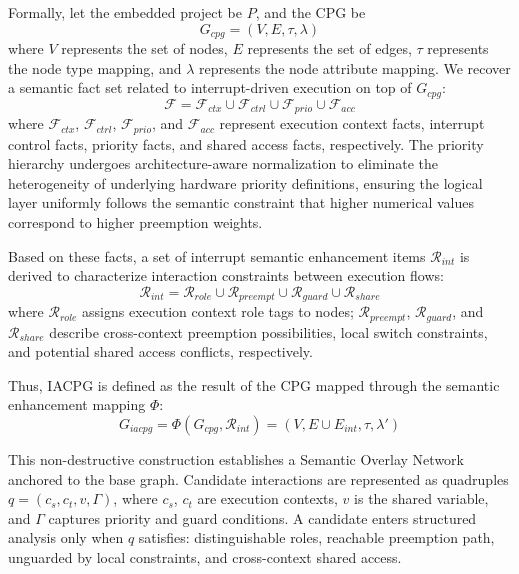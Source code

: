 \documentclass[conference]{IEEEtran}
\newcommand{\iacpg}{IACPG\xspace}
\begin{document}
Formally, let the embedded project be $P$, and the CPG be
\begin{equation}
G_{cpg}=(V,E,\tau,\lambda)
\end{equation}
where $V$ represents the set of nodes, $E$ represents the set of edges, $\tau$ represents the node type mapping, and $\lambda$ represents the node attribute mapping. We recover a semantic fact set related to interrupt-driven execution on top of $G_{cpg}$:
\begin{equation}
\mathcal{F}=\mathcal{F}_{ctx}\cup \mathcal{F}_{ctrl}\cup \mathcal{F}_{prio}\cup \mathcal{F}_{acc}
\end{equation}
where $\mathcal{F}_{ctx}$, $\mathcal{F}_{ctrl}$, $\mathcal{F}_{prio}$, and $\mathcal{F}_{acc}$ represent execution context facts, interrupt control facts, priority facts, and shared access facts, respectively. The priority hierarchy undergoes architecture-aware normalization to eliminate the heterogeneity of underlying hardware priority definitions, ensuring the logical layer uniformly follows the semantic constraint that higher numerical values correspond to higher preemption weights.

Based on these facts, a set of interrupt semantic enhancement items $\mathcal{R}_{int}$ is derived to characterize interaction constraints between execution flows:
\begin{equation}
\mathcal{R}_{int} = \mathcal{R}_{role}\cup \mathcal{R}_{preempt}\cup  \mathcal{R}_{guard}\cup \mathcal{R}_{share}
\end{equation}
where $\mathcal{R}_{role}$ assigns execution context role tags to nodes; $\mathcal{R}_{preempt}$, $\mathcal{R}_{guard}$, and $\mathcal{R}_{share}$ describe cross-context preemption possibilities, local switch constraints, and potential shared access conflicts, respectively.

Thus, \iacpg is defined as the result of the CPG mapped through the semantic enhancement mapping $\Phi$:
\begin{equation}
G_{iacpg} = \Phi(G_{cpg}, \mathcal{R}_{int}) = (V, E \cup E_{int}, \tau, \lambda')
\end{equation}

This non-destructive construction establishes a Semantic Overlay Network anchored to the base graph. Candidate interactions are represented as quadruples $q=(c_s,c_t,v,\Gamma)$, where $c_s$, $c_t$ are execution contexts, $v$ is the shared variable, and $\Gamma$ captures priority and guard conditions. A candidate enters structured analysis only when $q$ satisfies: distinguishable roles, reachable preemption path, unguarded by local constraints, and cross-context shared access.
\end{document}
